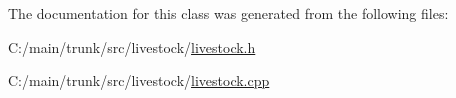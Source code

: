The documentation for this class was generated from the following files:\begin{DoxyCompactItemize}
\item 
C:/main/trunk/src/livestock/\hyperlink{livestock_8h}{livestock.h}\item 
C:/main/trunk/src/livestock/\hyperlink{livestock_8cpp}{livestock.cpp}\end{DoxyCompactItemize}

